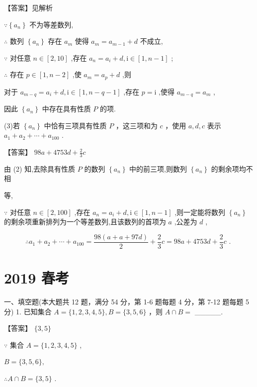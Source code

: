 \documentclass[10pt]{article}
\begin{document}
【答案】见解析

\(\because \left\{  {a}_{n}\right\}\) 不为等差数列,

\(\therefore\) 数列 \(\left\{  {a}_{n}\right\}\) 存在 \({a}_{m}\) 使得 \({a}_{m} = {a}_{m - 1} + d\) 不成立,

\(\because\) 对任意 \(n \in  \left\lbrack  {2,{10}}\right\rbrack\) ,存在 \({a}_{n} = {a}_{i} + d,\mathrm{i} \in  \left\lbrack  {1,n - 1}\right\rbrack\) ;

\(\therefore\) 存在 \(p \in  \left\lbrack  {1,n - 2}\right\rbrack\) ,使 \({a}_{m} = {a}_{p} + d\) ,则

对于 \({a}_{m - q} = {a}_{i} + d,\mathrm{i} \in  \left\lbrack  {1,n - q - 1}\right\rbrack\) ,存在 \(p = \mathrm{i}\) ,使得 \({a}_{m - q} = {a}_{m}\) ,

因此 \(\left\{  {a}_{n}\right\}\) 中存在具有性质 \(P\) 的项.

(3)若 \(\left\{  {a}_{n}\right\}\) 中恰有三项具有性质 \(P\) ，这三项和为 \(c\) ，使用 \(a,d,c\) 表示 \({a}_{1} + {a}_{2} + \cdots  + {a}_{100}\) .

【答案】 \({98a} + {4753d} + \frac{2}{3}c\)

由 (2) 知,去除具有性质 \(P\) 的数列 \(\left\{  {a}_{n}\right\}\) 中的前三项,则数列 \(\left\{  {a}_{n}\right\}\) 的剩余项均不相

等,

\(\because\) 对任意 \(n \in  \left\lbrack  {2,{100}}\right\rbrack\) ,存在 \({a}_{n} = {a}_{i} + d,\mathrm{i} \in  \left\lbrack  {1,n - 1}\right\rbrack\) ,则一定能将数列 \(\left\{  {a}_{n}\right\}\) 的剩余项重新排列为一个等差数列,且该数列的首项为 \(a\) ,公差为 \(d\) ,

\[
\therefore {a}_{1} + {a}_{2} + \cdots  + {a}_{100} = \frac{{98}\left( {a + a + {97d}}\right) }{2} + \frac{2}{3}c = {98a} + {4753d} + \frac{2}{3}c\text{ . }
\]

\section*{2019 春考}

一、填空题(本大题共 12 题，满分 54 分，第 1-6 题每题 4 分，第 7-12 题每题 5 分) 1. 已知集合 \(A = \{ 1,2,3,4,5\} ,B = \{ 3,5,6\}\) ，则 \(A \cap  B =\) \_\_\_\_\_.

【答案】 \(\{ 3,5\}\)

\(\because\) 集合 \(A = \{ 1,2,3,4,5\}\) ,

\(B = \{ 3,5,6\} ,\)

\(\therefore A \cap  B = \{ 3,5\}\) .
\end{document}
